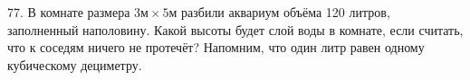 77. В комнате размера $3\text{м}\times5\text{м}$ разбили аквариум объёма 120 литров, заполненный наполовину. Какой высоты будет слой воды в комнате, если считать, что к соседям ничего не протечёт? Напомним, что один литр равен одному кубическому дециметру.\\
